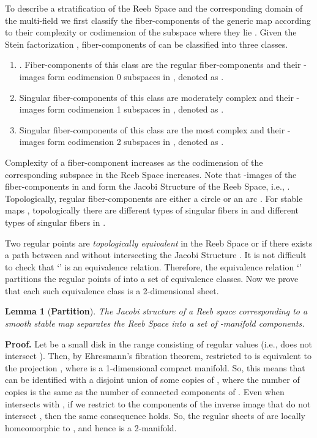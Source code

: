 \documentclass[twocolumn]{article}
\newtheorem{lemma}[theorem]{Lemma}
\renewenvironment{proof}{{\bf Proof. }}{\hspace*{\fill}\bigskip\noindent}
\begin{document}
To describe a stratification of the Reeb Space and the corresponding
domain of the multi-field we first classify the fiber-components of the generic map  according to their complexity or codimension of the subspace where they lie \cite{Saeki2014}.
 Given the Stein factorization , fiber-components  of  can be classified into three classes.
\begin{enumerate}
\item  . Fiber-components
of this class are the regular fiber-components and their -images 
form codimension 0 subspaces in , denoted as . 

\item  
Singular fiber-components of this class are moderately complex and
  their -images form codimension 1 subspaces  in , denoted as .

\item   
 Singular fiber-components of this class
  are the most complex and their -images form codimension 2
  subspaces  in , denoted as .
\end{enumerate}

\noindent
Complexity of a fiber-component increases as the codimension of the
corresponding subspace in the Reeb Space increases.
Note that -images of the fiber-components in  and  form the Jacobi
Structure  of the Reeb Space, i.e., . Topologically, regular fiber-components are
either a circle or an arc \cite{Saeki2015}. For stable maps , topologically there are  different types of singular
  fibers in  and  different types of singular
  fibers in  \cite{Saeki2015}.

Two regular points  are \emph{topologically
equivalent} in the Reeb Space  or  if there exists a path
between  and  without intersecting the Jacobi Structure .
It is not difficult to check that `' is an equivalence relation.
Therefore, the equivalence relation `' partitions the regular points
of  into a set of equivalence classes.
Now we prove that each such equivalence class is a 2-dimensional sheet.

\begin{lemma}[\textbf{Partition}]
\label{lem:partition}
The Jacobi structure   of a Reeb space  corresponding to a smooth
stable map  separates  the Reeb Space into a set
of -manifold components.
\end{lemma}
\noindent
\begin{proof}
Let  be a small disk in the range consisting of
regular values (i.e.,  does not intersect ).
Then, by Ehresmann's fibration theorem,
 restricted to  is equivalent to
the projection , where
 is a 1-dimensional compact manifold.
So, this means that  can
be identified with a disjoint union
of some copies of , where the number of copies
is the same as the number of connected components
of . Even when  intersects with ,
if we restrict  to the components
of the inverse image  that do not
intersect , then the same consequence holds.
So, the regular sheets of  are locally
homeomorphic to , and hence is a 2-manifold.
\end{proof}
\end{document}
